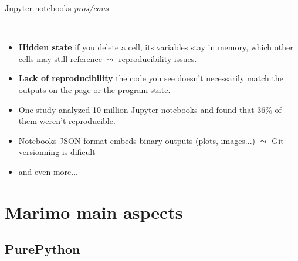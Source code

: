 \documentclass[11pt, serif, mathserif, compress]{beamer}  %
\begin{document}
\begin{frame}{Jupyter notebooks {\em pros/cons}}

  \begin {bclogo}[noborder=true, couleur=gray!20, couleurBarre=Chocolate, logo=\raisebox{1mm}{\,\huge😕}, margeG=-0.5, margeD=-0.5]
    {\ }\smallskip
    
    \begin{itemize}\setlength\itemsep{3mm}

    \item<2-> {\bf Hidden state} if you delete a cell, its variables stay in memory, which other cells may still reference $\leadsto$ reproducibility issues.
      
    \item<3-> {\bf Lack of reproducibility} the code you see doesn't necessarily match the outputs on the page or the program state.
      
    \item<4-> One study \cite{Guzharina1} analyzed 10 million Jupyter notebooks and found that 36\% of them weren't reproducible.
                  
    \item<5-> Notebooks JSON format embeds binary outputs (plots, images...) $\leadsto$ Git versionning is dificult

    \item<6-> and even more... 

    \end{itemize}
  \end{bclogo}
  
\end{frame}


\section{Marimo main aspects}

\subsection{PurePython}
\end{document}
